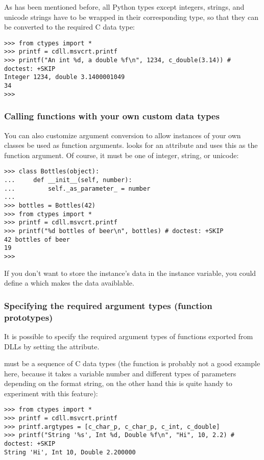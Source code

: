 As has been mentioned before, all Python types except integers,
strings, and unicode strings have to be wrapped in their corresponding
 type, so that they can be converted to the required C data
type:
\begin{verbatim}
>>> from ctypes import *
>>> printf = cdll.msvcrt.printf
>>> printf("An int %d, a double %f\n", 1234, c_double(3.14)) # doctest: +SKIP
Integer 1234, double 3.1400001049
34
>>>
\end{verbatim}


\subsubsection{Calling functions with your own custom data types\label{ctypes-calling-functions-with-own-custom-data-types}}

You can also customize  argument conversion to allow
instances of your own classes be used as function arguments.
 looks for an  attribute and uses this as
the function argument. Of course, it must be one of integer, string,
or unicode:
\begin{verbatim}
>>> class Bottles(object):
...     def __init__(self, number):
...         self._as_parameter_ = number
...
>>> bottles = Bottles(42)
>>> from ctypes import *
>>> printf = cdll.msvcrt.printf
>>> printf("%d bottles of beer\n", bottles) # doctest: +SKIP
42 bottles of beer
19
>>>
\end{verbatim}

If you don't want to store the instance's data in the
 instance variable, you could define a 
which makes the data avaiblable.


\subsubsection{Specifying the required argument types (function prototypes)\label{ctypes-specifying-required-argument-types}}

It is possible to specify the required argument types of functions
exported from DLLs by setting the  attribute.

 must be a sequence of C data types (the 
function is probably not a good example here, because it takes a
variable number and different types of parameters depending on the
format string, on the other hand this is quite handy to experiment
with this feature):
\begin{verbatim}
>>> from ctypes import *
>>> printf = cdll.msvcrt.printf
>>> printf.argtypes = [c_char_p, c_char_p, c_int, c_double]
>>> printf("String '%s', Int %d, Double %f\n", "Hi", 10, 2.2) # doctest: +SKIP
String 'Hi', Int 10, Double 2.200000
\end{verbatim}

